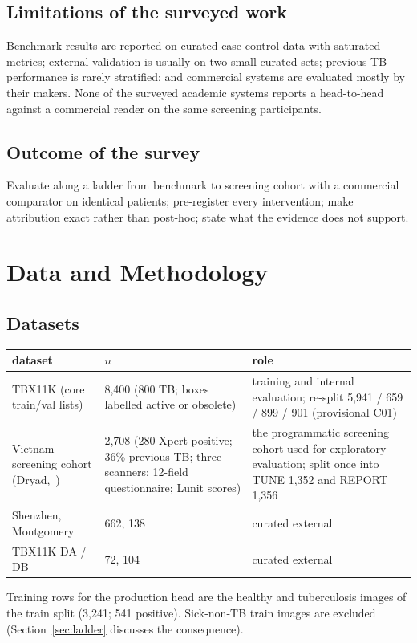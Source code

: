 \documentclass[12pt,a4paper]{report}
\begin{document}
\section{Limitations of the surveyed work}
Benchmark results are reported on curated case-control data with saturated metrics; external validation is usually on two small curated sets; previous-TB performance is rarely stratified; and commercial systems are evaluated mostly by their makers. None of the surveyed academic systems reports a head-to-head against a commercial reader on the same screening participants.

\section{Outcome of the survey}
Evaluate along a ladder from benchmark to screening cohort with a commercial comparator on identical patients; pre-register every intervention; make attribution exact rather than post-hoc; state what the evidence does not support.

\chapter{Data and Methodology}
\section{Datasets}
\begin{tabularx}{\textwidth}{@{}lLL@{}}\toprule
dataset & $n$ & role\\\midrule
TBX11K (core train/val lists) & 8,400 (800 TB; boxes labelled active or obsolete) & training and internal evaluation; re-split 5,941 / 659 / 899 / 901 (provisional C01)\\
Vietnam screening cohort (Dryad,~\cite{codlin2025}) & 2,708 (280 Xpert-positive; 36\% previous TB; three scanners; 12-field questionnaire; Lunit scores) & the programmatic screening cohort used for exploratory evaluation; split once into TUNE 1,352 and REPORT 1,356\\
Shenzhen, Montgomery & 662, 138 & curated external\\
TBX11K DA / DB & 72, 104 & curated external\\\bottomrule
\end{tabularx}

Training rows for the production head are the healthy and tuberculosis images of the train split (3,241; 541 positive). Sick-non-TB train images are excluded (Section~\ref{sec:ladder} discusses the consequence).
\end{document}
